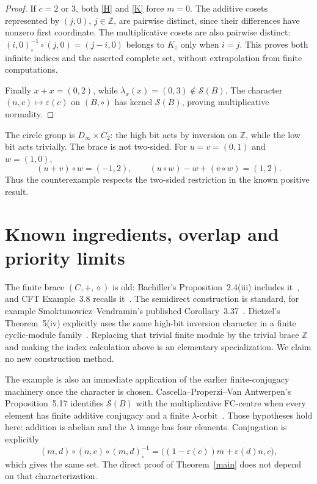 \documentclass[11pt]{article}
\newcommand{\Z}{\mathbb Z}
\newcommand{\Sset}{\mathcal S}
\begin{document}
\begin{proof}
If $c=2$ or $3$, both \eqref{H} and \eqref{K} force $m=0$.
The additive cosets represented by $(j,0)$, $j\in\Z$, are pairwise
distinct, since their differences have nonzero first coordinate.
The multiplicative cosets are also pairwise distinct:
$(i,0)^{-1}_{\circ}\circ(j,0)=(j-i,0)$ belongs to $K_z$ only when
$i=j$. This proves both infinite indices and the asserted complete
set, without extrapolation from finite computations.

Finally $x+x=(0,2)$, while
$\lambda_x(x)=(0,3)\notin\Sset(B)$.
The character $(n,c)\mapsto\varepsilon(c)$ on $(B,\circ)$ has
kernel $\Sset(B)$, proving multiplicative normality.
\end{proof}

The circle group is $D_\infty\times C_2$: the high bit acts by
inversion on $\Z$, while the low bit acts trivially.
The brace is not two-sided. For $u=v=(0,1)$ and $w=(1,0)$,
\[
 (u+v)\circ w=(-1,2),\qquad
 (u\circ w)-w+(v\circ w)=(1,2).
\]
Thus the counterexample respects the two-sided restriction in the
known positive result.

\section{Known ingredients, overlap and priority limits}
The finite brace $(C,+,\diamond)$ is old:
Bachiller's Proposition~2.4(iii) includes it~\cite{Bachiller}, and
CFT Example~3.8 recalls it~\cite{CFT}.
The semidirect construction is standard, for example
Smoktunowicz--Vendramin's published Corollary~3.37~\cite{SV}.
Dietzel's Theorem~5(iv) explicitly uses the same high-bit inversion
character in a finite cyclic-module family~\cite{Dietzel}.
Replacing that trivial finite module by the trivial brace $\Z$
and making the index calculation above is an elementary specialization.
We claim no new construction method.

The example is also an immediate application of the earlier
finite-conjugacy machinery once the character is chosen.
Cascella--Properzi--Van Antwerpen's Proposition~5.17 identifies
$\Sset(B)$ with the multiplicative FC-centre when every element has
finite additive conjugacy and a finite $\lambda$-orbit~\cite{CPV}.
Those hypotheses hold here: addition is abelian and the $\lambda$
image has four elements. Conjugation is explicitly
\[
 (m,d)\circ(n,c)\circ(m,d)^{-1}_{\circ}
   =\bigl((1-\varepsilon(c))m+\varepsilon(d)n,c\bigr),
\]
which gives the same set. The direct proof of
Theorem~\ref{main} does not depend on that characterization.
\end{document}
